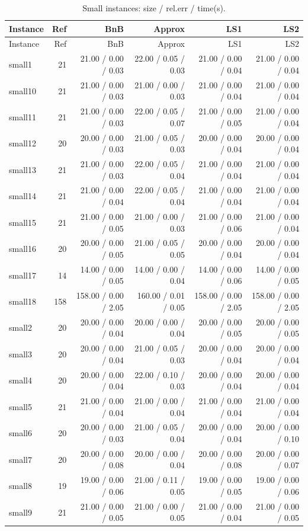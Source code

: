 \begin{longtable}{lrrrrr}
\caption{Small instances: size / rel.err / time(s).\label{tab:small}}\\
\toprule
Instance & Ref & BnB & Approx & LS1 & LS2\\
\midrule
\endfirsthead
\toprule
Instance & Ref & BnB & Approx & LS1 & LS2\\
\midrule
\endhead
small1 & 21 & 21.00 / 0.00 / 0.03 & 22.00 / 0.05 / 0.03 & 21.00 / 0.00 / 0.04 & 21.00 / 0.00 / 0.04\\
small10 & 21 & 21.00 / 0.00 / 0.03 & 21.00 / 0.00 / 0.03 & 21.00 / 0.00 / 0.04 & 21.00 / 0.00 / 0.04\\
small11 & 21 & 21.00 / 0.00 / 0.03 & 22.00 / 0.05 / 0.07 & 21.00 / 0.00 / 0.05 & 21.00 / 0.00 / 0.04\\
small12 & 20 & 20.00 / 0.00 / 0.03 & 21.00 / 0.05 / 0.03 & 20.00 / 0.00 / 0.04 & 20.00 / 0.00 / 0.04\\
small13 & 21 & 21.00 / 0.00 / 0.03 & 22.00 / 0.05 / 0.04 & 21.00 / 0.00 / 0.04 & 21.00 / 0.00 / 0.04\\
small14 & 21 & 21.00 / 0.00 / 0.04 & 22.00 / 0.05 / 0.04 & 21.00 / 0.00 / 0.04 & 21.00 / 0.00 / 0.04\\
small15 & 21 & 21.00 / 0.00 / 0.05 & 21.00 / 0.00 / 0.03 & 21.00 / 0.00 / 0.06 & 21.00 / 0.00 / 0.04\\
small16 & 20 & 20.00 / 0.00 / 0.05 & 21.00 / 0.05 / 0.05 & 20.00 / 0.00 / 0.04 & 20.00 / 0.00 / 0.04\\
small17 & 14 & 14.00 / 0.00 / 0.05 & 14.00 / 0.00 / 0.04 & 14.00 / 0.00 / 0.06 & 14.00 / 0.00 / 0.05\\
small18 & 158 & 158.00 / 0.00 / 2.05 & 160.00 / 0.01 / 0.05 & 158.00 / 0.00 / 2.05 & 158.00 / 0.00 / 2.05\\
small2 & 20 & 20.00 / 0.00 / 0.04 & 20.00 / 0.00 / 0.04 & 20.00 / 0.00 / 0.05 & 20.00 / 0.00 / 0.05\\
small3 & 20 & 20.00 / 0.00 / 0.04 & 21.00 / 0.05 / 0.03 & 20.00 / 0.00 / 0.04 & 20.00 / 0.00 / 0.04\\
small4 & 20 & 20.00 / 0.00 / 0.04 & 22.00 / 0.10 / 0.03 & 20.00 / 0.00 / 0.04 & 20.00 / 0.00 / 0.04\\
small5 & 21 & 21.00 / 0.00 / 0.04 & 21.00 / 0.00 / 0.04 & 21.00 / 0.00 / 0.04 & 21.00 / 0.00 / 0.04\\
small6 & 20 & 20.00 / 0.00 / 0.03 & 21.00 / 0.05 / 0.04 & 20.00 / 0.00 / 0.04 & 20.00 / 0.00 / 0.10\\
small7 & 20 & 20.00 / 0.00 / 0.08 & 20.00 / 0.00 / 0.04 & 20.00 / 0.00 / 0.08 & 20.00 / 0.00 / 0.07\\
small8 & 19 & 19.00 / 0.00 / 0.06 & 21.00 / 0.11 / 0.05 & 19.00 / 0.00 / 0.05 & 19.00 / 0.00 / 0.06\\
small9 & 21 & 21.00 / 0.00 / 0.05 & 21.00 / 0.00 / 0.05 & 21.00 / 0.00 / 0.04 & 21.00 / 0.00 / 0.05\\
\bottomrule
\end{longtable}
